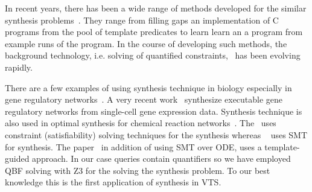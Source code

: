 In recent years, there has been a wide range of methods
developed for the similar synthesis problems~\cite{sktech,cegis,exampleSynth}.
%
They range from filling gaps an implementation of C programs from the
pool of template predicates to learn learn an a program from example
runs of the program.
%
In the course of developing such methods,
the background technology, i.e. solving of quantified
constraints,~\cite{depQBF,Z3quantifier,markusRabeSolver} has been evolving rapidly.

There are a few examples of using synthesis technique in biology especially in gene regulatory networks~\cite{shavit2016automated, fisher2015synthesising}. A very recent work~\cite{fisher2015synthesising} synthesize executable gene regulatory networks from single-cell gene expression data. 
Synthesis technique is also used in optimal synthesis for chemical reaction networks~\cite{cardelli2017syntax}. The~\cite{fisher2015synthesising} uses constraint (satisfiability) solving techniques for the synthesis whereas ~\cite{shavit2016automated} uses SMT for synthesis. The paper~\cite{cardelli2017syntax} in addition of using SMT over ODE, uses a template-guided approach. In our case queries contain quantifiers so we have employed QBF solving with Z3 for the solving the synthesis problem. To our best knowledge this is the first application of synthesis in VTS.
